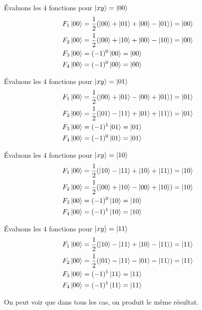 \documentclass{article}
\begin{document}
Évaluons les 4 fonctions pour $\ket{xy} = \ket{00}$ \\

\begin{align*}
    F_1\ket{00} &= \frac{1}{2}(\ket{00} + \ket{01} + \ket{00} - \ket{01}) = \ket{00} \\
    F_2\ket{00} &= \frac{1}{2}(\ket{00} + \ket{10} +\ket{00} - \ket{10}) = \ket{00} \\
    F_3\ket{00} &= (-1)^0\ket{00} = \ket{00} \\
    F_4\ket{00} &= (-1)^0\ket{00} = \ket{00} \\
\end{align*}

Évaluons les 4 fonctions pour $\ket{xy} = \ket{01}$ \\

\begin{align*}
    F_1\ket{00} &= \frac{1}{2}(\ket{00} + \ket{01} - \ket{00} + \ket{01}) = \ket{01} \\
    F_2\ket{00} &= \frac{1}{2}(\ket{01} - \ket{11} + \ket{01} + \ket{11}) = \ket{01} \\
    F_3\ket{00} &= (-1)^1\ket{01} = \ket{01} \\
    F_4\ket{00} &= (-1)^0\ket{01} = \ket{01} \\
\end{align*}

Évaluons les 4 fonctions pour $\ket{xy} = \ket{10}$ \\

\begin{align*}
    F_1\ket{00} &= \frac{1}{2}(\ket{10} - \ket{11} + \ket{10} + \ket{11}) = \ket{10} \\
    F_2\ket{00} &= \frac{1}{2}(\ket{00} + \ket{10} - \ket{00} + \ket{10}) = \ket{10} \\
    F_3\ket{00} &= (-1)^0\ket{10} = \ket{10} \\
    F_4\ket{00} &= (-1)^1\ket{10} = \ket{10} \\
\end{align*}

Évaluons les 4 fonctions pour $\ket{xy} = \ket{11}$ \\

\begin{align*}
    F_1\ket{00} &= \frac{1}{2}(\ket{10} - \ket{11} + \ket{10} - \ket{11}) = \ket{11} \\
    F_2\ket{00} &= \frac{1}{2}(\ket{01} - \ket{11} - \ket{01} - \ket{11}) = \ket{11} \\
    F_3\ket{00} &= (-1)^1\ket{11} = \ket{11} \\
    F_4\ket{00} &= (-1)^1\ket{11} = \ket{11} \\
\end{align*}

On peut voir que dans tous les cas, on produit le même résultat.
\end{document}
